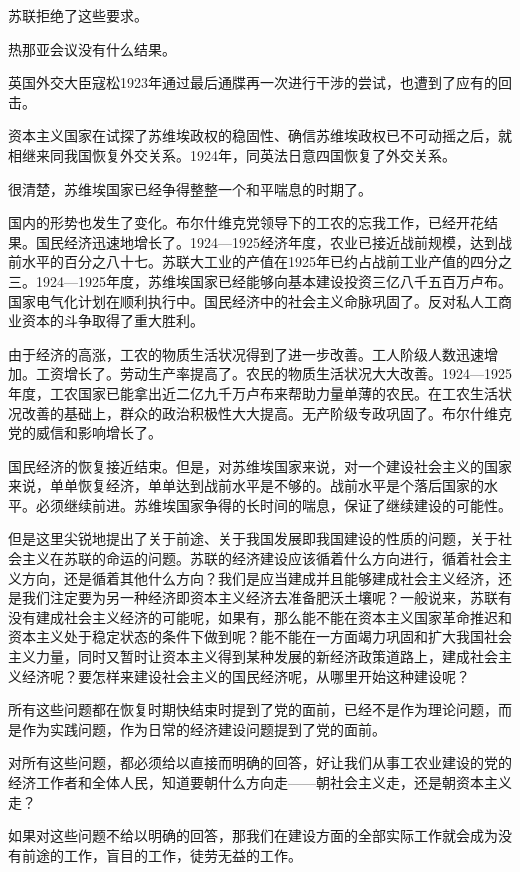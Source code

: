 苏联拒绝了这些要求。

热那亚会议没有什么结果。

英国外交大臣寇松1923年通过最后通牒再一次进行干涉的尝试，也遭到了应有的回击。

资本主义国家在试探了苏维埃政权的稳固性、确信苏维埃政权已不可动摇之后，就相继来同我国恢复外交关系。1924年，同英法日意四国恢复了外交关系。

很清楚，苏维埃国家已经争得整整一个和平喘息的时期了。

国内的形势也发生了变化。布尔什维克党领导下的工农的忘我工作，已经开花结果。国民经济迅速地增长了。1924—1925经济年度，农业已接近战前规模，达到战前水平的百分之八十七。苏联大工业的产值在1925年已约占战前工业产值的四分之三。1924—1925年度，苏维埃国家已经能够向基本建设投资三亿八千五百万卢布。国家电气化计划在顺利执行中。国民经济中的社会主义命脉巩固了。反对私人工商业资本的斗争取得了重大胜利。

由于经济的高涨，工农的物质生活状况得到了进一步改善。工人阶级人数迅速增加。工资增长了。劳动生产率提高了。农民的物质生活状况大大改善。1924—1925年度，工农国家已能拿出近二亿九千万卢布来帮助力量单薄的农民。在工农生活状况改善的基础上，群众的政治积极性大大提高。无产阶级专政巩固了。布尔什维克党的威信和影响增长了。

国民经济的恢复接近结束。但是，对苏维埃国家来说，对一个建设社会主义的国家来说，单单恢复经济，单单达到战前水平是不够的。战前水平是个落后国家的水平。必须继续前进。苏维埃国家争得的长时间的喘息，保证了继续建设的可能性。

但是这里尖锐地提出了关于前途、关于我国发展即我国建设的性质的问题，关于社会主义在苏联的命运的问题。苏联的经济建设应该循着什么方向进行，循着社会主义方向，还是循着其他什么方向？我们是应当建成并且能够建成社会主义经济，还是我们注定要为另一种经济即资本主义经济去准备肥沃土壤呢？一般说来，苏联有没有建成社会主义经济的可能呢，如果有，那么能不能在资本主义国家革命推迟和资本主义处于稳定状态的条件下做到呢？能不能在一方面竭力巩固和扩大我国社会主义力量，同时又暂时让资本主义得到某种发展的新经济政策道路上，建成社会主义经济呢？要怎样来建设社会主义的国民经济呢，从哪里开始这种建设呢？

所有这些问题都在恢复时期快结束时提到了党的面前，已经不是作为理论问题，而是作为实践问题，作为日常的经济建设问题提到了党的面前。

对所有这些问题，都必须给以直接而明确的回答，好让我们从事工农业建设的党的经济工作者和全体人民，知道要朝什么方向走——朝社会主义走，还是朝资本主义走？

如果对这些问题不给以明确的回答，那我们在建设方面的全部实际工作就会成为没有前途的工作，盲目的工作，徒劳无益的工作。

